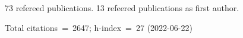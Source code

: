 73 refereed publications. 13 refeered publications as first author.

Total citations~=~2647; h-index~=~27 (2022-06-22)